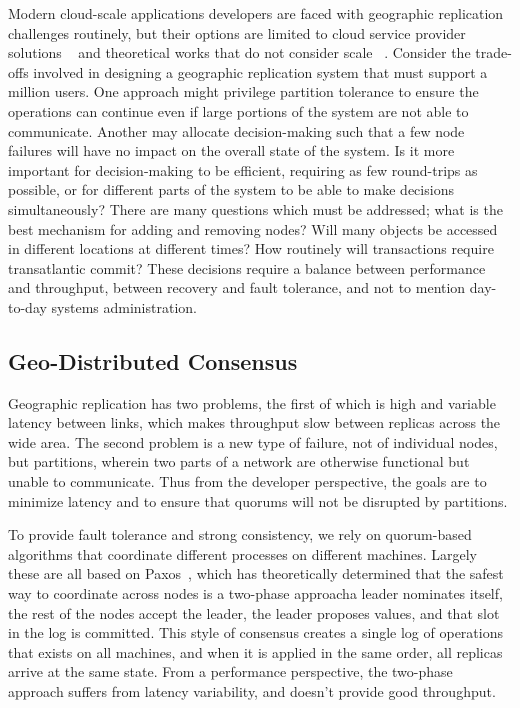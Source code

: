 \documentclass[sigplan,screen,review,anonymous,nonacm]{acmart}
\begin{document}
Modern cloud-scale applications developers are faced with geographic replication 
challenges routinely, but their options are limited to cloud service provider solutions 
~\cite{spanner} and theoretical works that do not consider scale 
~\cite{mdcc, epaxos, fast_paxos, vertical_paxos, wpaxos}.
Consider the trade-offs involved in designing a geographic replication system that must 
support a million users. 
One approach might privilege partition tolerance to ensure the operations can continue
even if large portions of the system are not able to communicate.
Another may allocate decision-making such that a few node failures will have no
impact on the overall state of the system.
Is it more important for decision-making to be efficient, requiring as few round-trips 
as possible, or for different parts of the system to be able to make decisions 
simultaneously?
There are many questions which must be addressed; what is the best mechanism for adding 
and removing nodes? 
Will many objects be accessed in different locations at different times?
How routinely will transactions require transatlantic commit?
These decisions require a balance between performance and throughput, between 
recovery and fault tolerance, and not to mention day-to-day systems administration.

\subsection{Geo-Distributed Consensus}
Geographic replication has two problems, the first of which is high and variable 
latency between links, which makes throughput slow between replicas across the wide 
area.
The second problem is a new type of failure, not of individual nodes, but partitions,
wherein two parts of a network are otherwise functional but unable to communicate.
Thus from the developer perspective, the goals are to minimize latency and to ensure
that quorums will not be disrupted by partitions.

To provide fault tolerance and strong consistency, we rely on quorum-based algorithms 
that coordinate different processes on different machines.
Largely these are all based on Paxos~\cite{generalized_paxos}, which has theoretically 
determined that the safest way to coordinate across nodes is a two-phase 
approach\textemdash a leader nominates itself, the rest of the nodes accept the leader, 
the leader proposes values, and that slot in the log is committed. 
This style of consensus creates a single log of operations that exists on all machines, 
and when it is applied in the same order, all replicas arrive at the same state.
From a performance perspective, the two-phase approach suffers from latency variability, 
and doesn't provide good throughput. 
\end{document}
